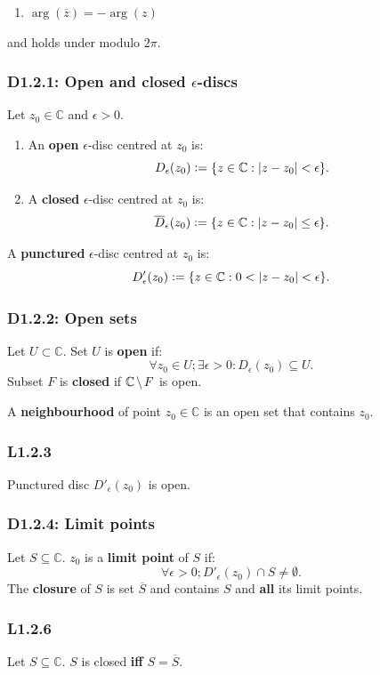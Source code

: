 \documentclass{article}
\newcommand{\deq}{\vcentcolon=}
\begin{document}
\begin{multicols*}{3}
\begin{enumerate}
    \item $\arg(\overline{z})=-\arg(z)$
\end{enumerate}
and holds under modulo $2\pi$.

\subsubsection*{D1.2.1: Open and closed $\epsilon$-discs}
Let $z_0\in\mathbb{C}$ and $\epsilon>0$.
\begin{enumerate}
    \item An \textbf{open} $\epsilon$-disc
    centred at $z_0$ is:
    $$D_{\epsilon}(z_0)
    \deq\{z\in\mathbb{C}:|z-z_0|<\epsilon\}.$$

    \item A \textbf{closed} $\epsilon$-disc
    centred at $z_0$ is:
    $$\overline{D}_{\epsilon}(z_0)
    \deq\{z\in\mathbb{C}:|z-z_0|\leq\epsilon\}.$$
\end{enumerate}
A \textbf{punctured} $\epsilon$-disc centred at $z_0$ is:
$$D'_{\epsilon}(z_0)\deq\{z\in\mathbb{C}:0<|z-z_0|<\epsilon\}.$$

\subsubsection*{D1.2.2: Open sets}
Let $U\subset\mathbb{C}$. Set $U$ is \textbf{open} if:
$$\forall z_0\in U;\exists\epsilon>0:D_{\epsilon}(z_0)\subseteq U.$$
Subset $F$ is \textbf{closed} if
$\mathbb{C}\hspace{0.02in}\backslash\hspace{0.02in} F$ is open.

A \textbf{neighbourhood} of point $z_0\in\mathbb{C}$
is an open set that contains $z_0$.

\subsubsection*{L1.2.3}
Punctured disc $D'_{\epsilon}(z_0)$ is open.

\subsubsection*{D1.2.4: Limit points}
Let $S\subseteq\mathbb{C}$. $z_0$ is a \textbf{limit point} of $S$ if:
$$\forall\epsilon>0; D'_{\epsilon}(z_0)\cap S\neq\emptyset.$$
The \textbf{closure} of $S$ is set $\overline{S}$ and contains $S$
and \textbf{all} its limit points.

\subsubsection*{L1.2.6}
Let $S\subseteq\mathbb{C}$.
$S$ is closed \textbf{if{}f} $S=\overline{S}$.


\end{multicols*}
\end{document}

